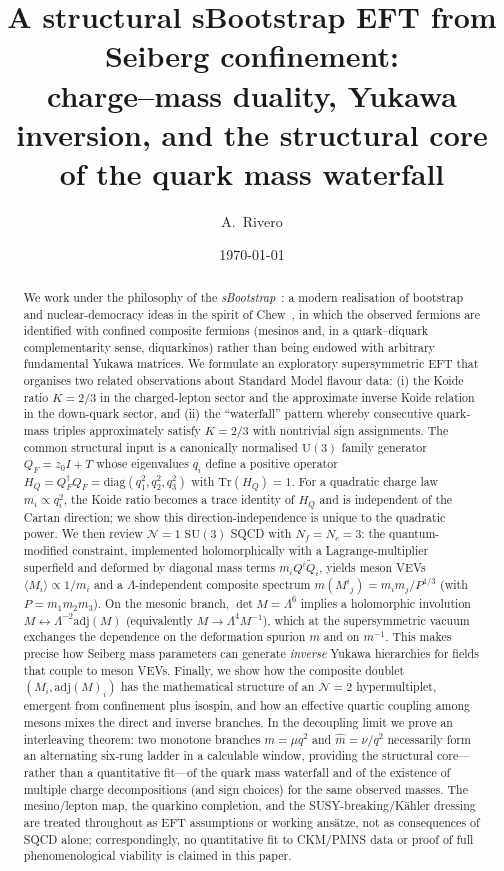 \documentclass[11pt,a4paper]{article}
\title{A structural sBootstrap EFT from Seiberg confinement:\\
charge--mass duality, Yukawa inversion, and the structural core of the quark mass waterfall}
\author{A.\ Rivero}
\date{\today}
\newcommand{\SU}{\mathrm{SU}}
\newcommand{\UU}{\mathrm{U}}
\newcommand{\Nf}{N_f}
\newcommand{\Nc}{N_c}
\newcommand{\Tr}{\mathrm{Tr}}
\newcommand{\adj}{\mathrm{adj}}
\newcommand{\diag}{\mathrm{diag}}
\begin{document}
\maketitle

\begin{abstract}
  We work under the philosophy of the \emph{sBootstrap}~\cite{Rivero:2024epjc}:
  a modern realisation of bootstrap and nuclear-democracy ideas in the spirit
  of Chew~\cite{Chew:1962}, in which the observed fermions are identified with
  confined composite fermions (mesinos and, in a quark--diquark
  complementarity sense, diquarkinos) rather than being endowed with arbitrary
  fundamental
  Yukawa matrices.
  We formulate an exploratory supersymmetric EFT that organises two related
  observations about Standard Model
  flavour data:
  (i) the Koide ratio $K=2/3$ in the charged-lepton sector and the
  approximate inverse Koide relation in the down-quark sector, and
  (ii) the ``waterfall'' pattern whereby consecutive quark-mass triples
  approximately satisfy $K=2/3$ with nontrivial sign assignments.
  The common structural input is a canonically normalised $\UU(3)$ family
  generator $Q_F=z_0 I+T$ whose eigenvalues $q_i$ define a positive operator
  $H_Q=Q_F^\dagger Q_F=\diag(q_1^2,q_2^2,q_3^2)$ with $\Tr(H_Q)=1$.
  For a quadratic charge law $m_i\propto q_i^2$, the Koide ratio becomes a
  trace identity of $H_Q$ and is independent of the Cartan direction; we
  show this direction-independence is unique to the quadratic power.
  We then review $\mathcal{N}{=}1$ $\SU(3)$ SQCD with $\Nf=\Nc=3$:
  the quantum-modified constraint, implemented holomorphically with a
  Lagrange-multiplier superfield and deformed by diagonal mass terms
  $m_i Q^i\tilde Q_i$, yields meson VEVs $\langle M_i\rangle\propto 1/m_i$
  and a $\Lambda$-independent composite spectrum
  $m(M^i{}_j)=m_i m_j/P^{1/3}$ (with $P=m_1m_2m_3$).
  On the mesonic branch, $\det M=\Lambda^6$ implies a holomorphic involution
  $M \leftrightarrow \Lambda^{-2}\adj(M)$ (equivalently $M\to\Lambda^4 M^{-1}$),
  which at the supersymmetric vacuum exchanges the dependence on the
  deformation spurion $m$ and on $m^{-1}$.
  This makes precise how Seiberg mass parameters can generate \emph{inverse}
  Yukawa hierarchies for fields that couple to meson VEVs.
  Finally, we show how the composite doublet $(M_i, \adj(M)_i)$
  has the mathematical structure of an $\mathcal{N}{=}2$ hypermultiplet,
  emergent from confinement plus isospin, and how an effective quartic coupling
  among mesons mixes the direct and inverse branches.  In the
  decoupling limit we prove an interleaving theorem: two monotone branches
  $m=\mu q^2$ and $\hat m=\nu/q^2$ necessarily form an alternating six-rung
  ladder in a calculable window, providing the structural core---rather than a
  quantitative fit---of the quark mass waterfall and of the existence of
  multiple charge decompositions (and sign choices) for the same observed
  masses.  The mesino/lepton map, the quarkino completion, and the
  SUSY-breaking/K\"ahler dressing are treated throughout as EFT assumptions or
  working ans\"atze, not as consequences of SQCD alone; correspondingly, no
  quantitative fit to CKM/PMNS data or proof of full phenomenological viability
  is claimed in this paper.
\end{abstract}
\end{document}
